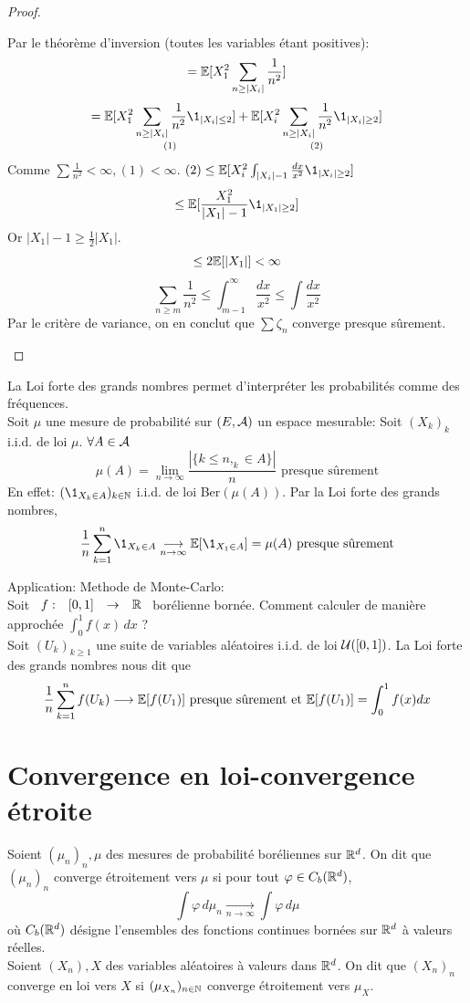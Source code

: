 \documentclass[]{report}
\begin{document}
\begin{proof}
\begin{enumerate}
            Par le théorème d'inversion (toutes les variables étant positives):
            \[=\mathbb{E}[X_1^2 \sum_{n\ge |X_i|}\frac{1}{n^2}]\]
            \[=\underset{(1)}{\Ea[X_1^2\sum_{n\ge |X_i|}\frac{1}{n^2}\1_{|X_i|\le 2}]}+\underset{(2)}{\Ea[X_i^2\sum_{n\ge |X_i|}\frac{1}{n^2}\1_{|X_i|\ge 2}]}\]
            Comme $\sum \frac{1}{n^2}<\infty,(1)<\infty$. $(2)\le \Ea[X_i^2\int_{|X_i|-1}\frac{dx}{x^2}\1_{|X_i|\ge 2}]$
            \[\le \Ea[\frac{X_1^2}{|X_1|-1}\1_{|X_1|\ge 2}]\]
            Or $|X_1|-1\ge \frac{1}{2}|X_1|$.
            \[\le 2 \mathbb{E}[|X_1|]<\infty\]
            \[\sum_{n\ge m}\frac{1}{n^2}\le \int_{m-1}^{\infty}\frac{dx}{x^2}\le \int \frac{dx}{x^2}\]
            Par le critère de variance, on en conclut que $\sum \zeta_n$ converge presque sûrement.
        \end{enumerate}
    \end{proof}

    \begin{re}{}{}
        La Loi forte des grands nombres permet d'interpréter les probabilités comme des fréquences.\\
        Soit $\mu$ une mesure de probabilité sur $(E,\mathcal{A})$ un espace mesurable: Soit $(X_k)_k$ i.i.d. de loi $\mu$. $\forall A\in \mathcal{A}$
        \[\mu(A)=\lim_{n\to \infty}\frac{|\{k\le n,_k\in A\}|}{n}\text{ presque sûrement}\]
        En effet: $(\1_{X_k\in A})_{k\in \N}$ i.i.d. de loi Ber$(\mu(A))$. Par la Loi forte des grands nombres,
        \[\frac{1}{n}\sum_{k=1}^{n}\1_{X_k\in A}\underset{n\to\infty}{\longrightarrow} \Ea[\1_{X_1\in A}]=\mu(A)\text{ presque sûrement}\]
    \end{re}

    Application: Methode de Monte-Carlo:\\
    Soit $\begin{array}{ccccc} f : & [0,1] & \to & \mathbb{R} \end{array}$ borélienne bornée. Comment calculer de manière approchée $\int_{0}^{1}f(x)\, dx$ ?\\
    Soit $(U_k)_{k\ge 1}$ une suite de variables aléatoires i.i.d. de loi $\mathcal{U}([0,1])$. La Loi forte des grands nombres nous dit que
    \[\frac{1}{n}\sum_{k=1}^{n}f(U_k)\longrightarrow\mathbb{E}[f(U_1)]\text{ presque sûrement et }\mathbb{E}[f(U_1)]=\int_{0}^{1}f(x)dx\]

    \section{Convergence en loi-convergence étroite}

    \begin{df}{}{}
        Soient $(\mu_n)_n,\mu$ des mesures de probabilité boréliennes sur $\mathbb{R}^d$. On dit que $(\mu_n)_n$ converge étroitement vers $\mu$ si pour tout $\varphi\in C_b(\mathbb{R}^d)$,
        \[\int \varphi\, d\mu_n\underset{n\to \infty}{\longrightarrow}\int \varphi\, d\mu\]
        où $C_b(\mathbb{R}^d)$ désigne l'ensembles des fonctions continues bornées sur $\mathbb{R}^d$ à valeurs réelles.\\
        Soient $(X_n),X$ des variables aléatoires à valeurs dans $\mathbb{R}^d$. On dit que $(X_n)_n$ converge en loi vers $X$ si $(\mu_{X_n})_{n\in\mathbb{N}}$ converge étroitement vers $\mu_X$.
    \end{df}
\end{document}

